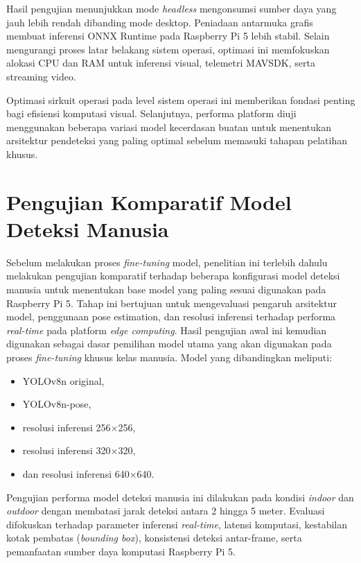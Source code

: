 Hasil pengujian menunjukkan mode \textit{headless} mengonsumsi sumber daya yang jauh lebih rendah dibanding mode desktop. Peniadaan antarmuka grafis membuat inferensi ONNX Runtime pada Raspberry Pi 5 lebih stabil. Selain mengurangi proses latar belakang sistem operasi, optimasi ini memfokuskan alokasi CPU dan RAM untuk inferensi visual, telemetri MAVSDK, serta streaming video.

Optimasi sirkuit operasi pada level sistem operasi ini memberikan fondasi penting bagi efisiensi komputasi visual. Selanjutnya, performa platform diuji menggunakan beberapa variasi model kecerdasan buatan untuk menentukan arsitektur pendeteksi yang paling optimal sebelum memasuki tahapan pelatihan khusus.

\section{Pengujian Komparatif Model Deteksi Manusia}

Sebelum melakukan proses \textit{fine-tuning} model, penelitian ini terlebih dahulu melakukan pengujian komparatif terhadap beberapa konfigurasi model deteksi manusia untuk menentukan base model yang paling sesuai digunakan pada Raspberry Pi 5.
Tahap ini bertujuan untuk mengevaluasi pengaruh arsitektur model, penggunaan pose estimation, dan resolusi inferensi terhadap performa \textit{real-time} pada platform \textit{edge computing}.
Hasil pengujian awal ini kemudian digunakan sebagai dasar pemilihan model utama yang akan digunakan pada proses \textit{fine-tuning} khusus kelas manusia.
Model yang dibandingkan meliputi:

\begin{itemize}
	\item YOLOv8n original,
	\item YOLOv8n-pose,
	\item resolusi inferensi 256×256,
	\item resolusi inferensi 320×320,
	\item dan resolusi inferensi 640×640.
\end{itemize}

Pengujian performa model deteksi manusia ini dilakukan pada kondisi \textit{indoor} dan \textit{outdoor} dengan membatasi jarak deteksi antara 2 hingga 5 meter. Evaluasi difokuskan terhadap parameter inferensi \textit{real-time}, latensi komputasi, kestabilan kotak pembatas (\textit{bounding box}), konsistensi deteksi antar-frame, serta pemanfaatan sumber daya komputasi Raspberry Pi 5.

